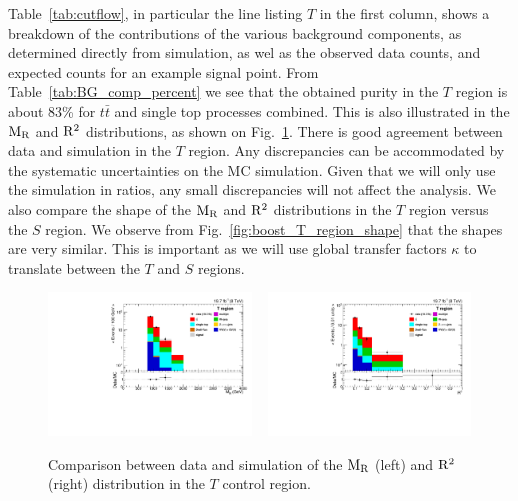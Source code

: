 Table~\ref{tab:cutflow}, in particular the line listing $T$ in the first column, shows a breakdown
of the contributions of the various background components,
as determined directly from simulation, as wel as the observed data counts, and expected counts for
an example signal point. From Table~\ref{tab:BG_comp_percent} we see that the obtained purity in the
$T$ region is about 83\% for $t\bar{t}$ and single top processes combined. This is also
illustrated in the $\mathrm{M_R}$ and $\mathrm{R^2}$ distributions, as shown on Fig.~\ref{fig:boost_T_region_MR_Rsq}.
There is good agreement between data and simulation in the $T$ region. Any discrepancies can
be accommodated by the systematic uncertainties on the MC simulation. Given that we will only use
the simulation in ratios, any small discrepancies will not affect the analysis.
We also compare the shape of the $\mathrm{M_R}$ and $\mathrm{R^2}$ distributions in the $T$ region versus the $S$
region. We observe from Fig.~\ref{fig:boost_T_region_shape} that the shapes are very similar. This
is important as we will use global transfer factors $\kappa$ to translate between the $T$ and $S$
regions. 


\begin{figure}[htb]
\centering
\includegraphics[width=0.48\textwidth]
{figures/razor_selection/plots/DataMC_MR_g1Mbg1W1LlmT100_mdPhig0p5_width}
~
\includegraphics[width=0.48\textwidth]
{figures/razor_selection/plots/DataMC_R2_g1Mbg1W1LlmT100_mdPhig0p5_width}
\caption{Comparison between data and simulation of the $\mathrm{M_R}$ (left) and $\mathrm{R^2}$ (right)
distribution in the $T$ control region. 
\label{fig:boost_T_region_MR_Rsq}}
\end{figure}

